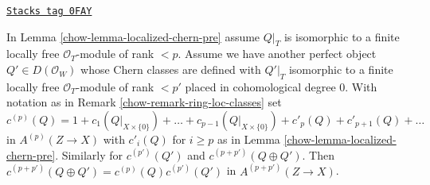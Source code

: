 \begin{lemma}
\label{chow-lemma-localized-chern-pre-sum-c}
\href{https://stacks.math.columbia.edu/tag/0FAY}{\texttt{Stacks tag 0FAY}}

In Lemma \ref{chow-lemma-localized-chern-pre} assume $Q|_T$ is isomorphic
to a finite locally free $\mathcal{O}_T$-module of rank $< p$.
Assume we have another perfect object $Q' \in D(\mathcal{O}_W)$
whose Chern classes are defined with $Q'|_T$ isomorphic to a
finite locally free $\mathcal{O}_T$-module of rank $< p'$ placed
in cohomological degree $0$. With notation as in
Remark \ref{chow-remark-ring-loc-classes} set
$$
c^{(p)}(Q) = 1 + c_1(Q|_{X \times \{0\}}) + \ldots +
c_{p - 1}(Q|_{X \times \{0\}}) +
c'_{p}(Q) + c'_{p + 1}(Q) + \ldots
$$
in $A^{(p)}(Z \to X)$ with $c'_i(Q)$ for $i \geq p$ as in
Lemma \ref{chow-lemma-localized-chern-pre}. Similarly for $c^{(p')}(Q')$ and
$c^{(p + p')}(Q \oplus Q')$.
Then $c^{(p + p')}(Q \oplus Q') = c^{(p)}(Q)c^{(p')}(Q')$
in $A^{(p + p')}(Z \to X)$.
\end{lemma}


